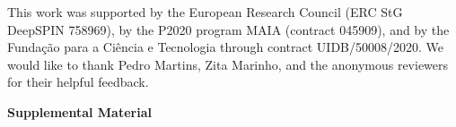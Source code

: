 \documentclass{article}
\newcommand{\andre}[1]{{\textcolor{blue}{\bf [{\sc Andre:} #1]}}}
\begin{document}
\begin{ack}
This work was supported by the European Research Council (ERC StG DeepSPIN 758969),
by the P2020 program MAIA (contract 045909), and by the Funda\c{c}\~ao para a Ci\^encia e Tecnologia 
through contract UIDB/50008/2020. 
We would like to thank Pedro Martins, Zita Marinho, and the anonymous reviewers for their helpful feedback.




\end{ack}







\newpage
\onecolumn

\appendix

\bigskip

\begin{center}
\LARGE{\bf Supplemental Material}
\end{center}


\begin{comment}
\section{Existence and Uniqueness of the Regularized Prediction Map}
\label{sec:appendix_existence}

We show here that the $\Omega$-RPM in \eqref{eq:reg_prediction} is well defined, i.e., the arg-max contains one and only one density.

The constraint set $\mathcal{M}_+^1(S)$ is convex, because for any $p,q \in \mathcal{M}_+^1(S)$ and any $\eta\in[0,1]$, we have that $\eta \, p + (1-\eta)\, q \in \mathcal{M}_+^1(S)$. The first term in \eqref{eq:reg_prediction} is clearly continuous (thus also lower semi-continuous), since it is linear w.r.t. $p$. For the same reason, it is concave (and also convex); in fact, for any $\eta\in[0,1]$, \andre{improve the writing here}
\[
\mathbb{E}_{\eta \, p + (1-\eta)\, q}[f(t)] = \eta\, \mathbb{E}_{p}[f(t)] + (1-\eta) \, \mathbb{E}_{q}[f(t)].
\]
Since $\Omega$ is proper, a sufficient condition for the existence of maximizer(s) in \eqref{eq:reg_prediction} is thus that $-\mathbb{E}_{p}[f(t)]$ is also proper \citep{Bauschke_Combettes2011}, \andre{point to section?} \textit{i.e.}, that $-\mathbb{E}_{p}[f(t)]$ is never equal to $-\infty$, which is guaranteed by the definition of $\mathcal{F}$ in \eqref{eq:proper}.

Finally, since $-\mathbb{E}_{p}[f(t)]$ is lower semi-continuous, proper, and convex, a sufficient condition for the uniqueness of the arg-max in \eqref{eq:reg_prediction} is that $\Omega$ be strictly convex, in addition to being convex and lower semi-continuous. \andre{improve the writing; R3 said: It seems to me that the proof can be constructed by saying that the expectation term varies linearly in p (and is bounded), and the regularizer is strictly convex (so (-regularizer) is strictly concave). Then Linear + Concave = Concave, and has a global maximum. It is good if you have rigorous proofs, but adding more accessible intuitions would increase the accessibility of the work.}
\end{comment}
\end{document}
